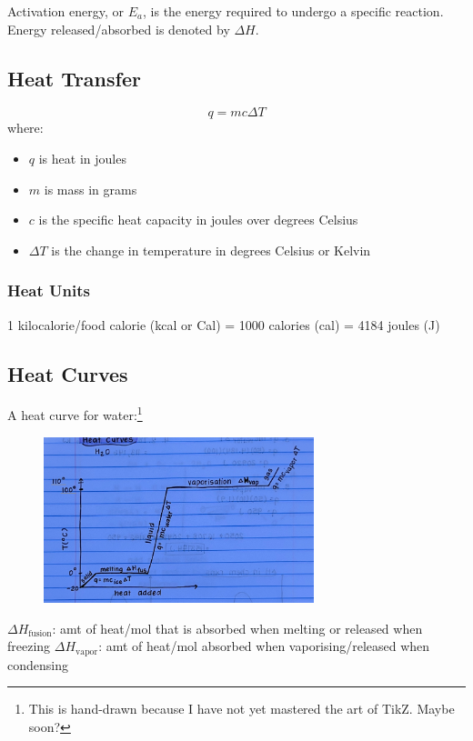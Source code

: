 \documentclass[a4paper, 12pt]{article}
\begin{document}
Activation energy, or \(E_a\), is the energy required to undergo a specific reaction. Energy released/absorbed is denoted by \(\Delta H\).

\subsection*{Heat Transfer}

\begin{equation}\label{heattransfer}
q = mc \Delta T
\end{equation}
where:
\begin{itemize}[leftmargin=*, nosep]
\item $q$ is heat in joules
\item $m$ is mass in grams
\item $c$ is the specific heat capacity in joules over degrees Celsius
\item $\Delta T$ is the change in temperature in degrees Celsius or Kelvin
\end{itemize}

\subsubsection*{Heat Units}

1 kilocalorie/food calorie (kcal or Cal) = 1000 calories (cal) = 4184 joules (J)

\subsection*{Heat Curves}
A heat curve for water:\footnote{This is hand-drawn because I have not yet mastered the art of TikZ. Maybe soon?}

\begin{figure}[H]
\centering
\includegraphics[width=0.7\textwidth]{heatcurve.jpg}
\end{figure}

$\Delta H_\text{fusion}$: amt of heat/mol that is absorbed when melting or released when freezing
$\Delta H_\text{vapor}$: amt of heat/mol absorbed when vaporising/released when condensing
\end{document}
